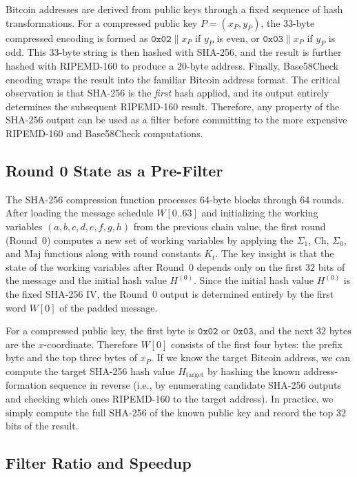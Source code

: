 \documentclass[11pt,a4paper]{article}
\theoremstyle{definition}
\begin{document}
Bitcoin addresses are derived from public keys through a fixed sequence of hash transformations. For a compressed public key $P = (x_P, y_P)$, the 33-byte compressed encoding is formed as $\texttt{0x02}\|x_P$ if $y_P$ is even, or $\texttt{0x03}\|x_P$ if $y_P$ is odd. This 33-byte string is then hashed with SHA-256, and the result is further hashed with RIPEMD-160 to produce a 20-byte address. Finally, Base58Check encoding wraps the result into the familiar Bitcoin address format. The critical observation is that SHA-256 is the \emph{first} hash applied, and its output entirely determines the subsequent RIPEMD-160 result. Therefore, any property of the SHA-256 output can be used as a filter before committing to the more expensive RIPEMD-160 and Base58Check computations.

\subsection{Round 0 State as a Pre-Filter}

The SHA-256 compression function processes 64-byte blocks through 64 rounds. After loading the message schedule $W[0..63]$ and initializing the working variables $(a, b, c, d, e, f, g, h)$ from the previous chain value, the first round (Round~0) computes a new set of working variables by applying the $\Sigma_1$, $\mathrm{Ch}$, $\Sigma_0$, and $\mathrm{Maj}$ functions along with round constants $K_t$. The key insight is that the state of the working variables after Round~0 depends only on the first 32 bits of the message and the initial hash value $H^{(0)}$. Since the initial hash value $H^{(0)}$ is the fixed SHA-256 IV, the Round~0 output is determined entirely by the first word $W[0]$ of the padded message.

For a compressed public key, the first byte is $\texttt{0x02}$ or $\texttt{0x03}$, and the next 32 bytes are the $x$-coordinate. Therefore $W[0]$ consists of the first four bytes: the prefix byte and the top three bytes of $x_P$. If we know the target Bitcoin address, we can compute the target SHA-256 hash value $H_{\mathrm{target}}$ by hashing the known address-formation sequence in reverse (i.e., by enumerating candidate SHA-256 outputs and checking which ones RIPEMD-160 to the target address). In practice, we simply compute the full SHA-256 of the known public key and record the top 32 bits of the result.

\subsection{Filter Ratio and Speedup}
\end{document}
